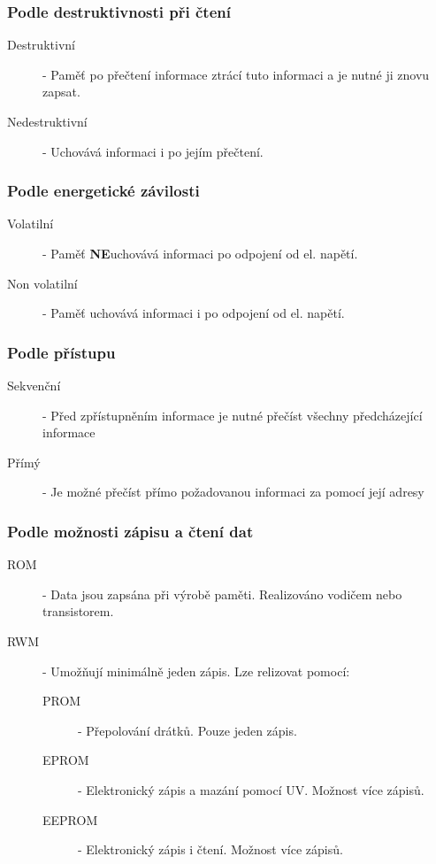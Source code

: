 \subsubsection{Podle destruktivnosti při čtení}
\begin{description}
  \item[Destruktivní] - Paměť po přečtení informace ztrácí tuto informaci a je nutné ji znovu zapsat.
  \item[Nedestruktivní] - Uchovává informaci i po jejím přečtení.
\end{description}
\subsubsection{Podle energetické závilosti}
\begin{description}
  \item[Volatilní] - Paměť \textbf{NE}uchovává informaci po odpojení od el. napětí.
  \item[Non volatilní] - Paměť uchovává informaci i po odpojení od el. napětí.
\end{description}
\subsubsection{Podle přístupu}
\begin{description}
  \item[Sekvenční] - Před zpřístupněním informace je nutné přečíst všechny předcházející informace
  \item[Přímý] - Je možné přečíst přímo požadovanou informaci za pomocí její adresy
\end{description}
\subsubsection{Podle možnosti zápisu a čtení dat}
\begin{description}
  \item[ROM] - Data jsou zapsána při výrobě paměti. Realizováno vodičem nebo transistorem.
  \item[RWM] - Umožňují minimálně jeden zápis. Lze relizovat pomocí:
    \begin{description}
      \item[PROM] - Přepolování drátků. Pouze jeden zápis.
      \item[EPROM] - Elektronický zápis a mazání pomocí UV. Možnost více zápisů.
      \item[EEPROM] - Elektronický zápis i čtení. Možnost více zápisů.
    \end{description}
\end{description}
